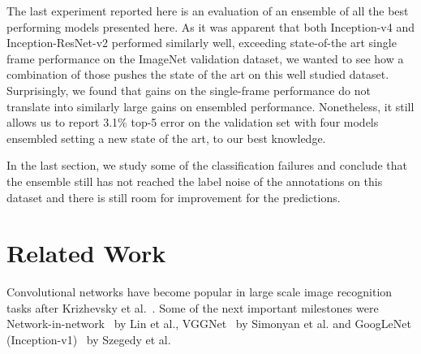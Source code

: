 \documentclass[10pt,twocolumn,letterpaper]{article}
\begin{document}
The last experiment reported here is an evaluation of an ensemble of
all the best performing models  presented here. As it was
apparent that both Inception-v4 and Inception-ResNet-v2 performed
similarly well, exceeding state-of-the art single frame performance
on the ImageNet validation dataset, we wanted to see how a combination
of those pushes the state of the art on this well studied dataset.
Surprisingly, we found that gains on the single-frame performance do not
translate into similarly large gains on ensembled performance. Nonetheless,
it still allows us to report 3.1\% top-5 error on the validation set with
four models ensembled setting a new state of the art, to our best
knowledge.

In the last section, we study some of the classification failures and
conclude that the ensemble still has not reached the label noise of
the annotations on this dataset and there is still room for improvement
for the predictions.

\section{Related Work}

Convolutional networks have become popular in large scale image recognition
tasks after Krizhevsky et al.~\cite{krizhevsky2012imagenet}. Some of the next important
milestones were Network-in-network~\cite{lin2013network} by Lin et al.,
VGGNet~\cite{simonyan2014very} by Simonyan et al. and GoogLeNet
(Inception-v1)~\cite{szegedy2015going} by Szegedy et al.
\end{document}
